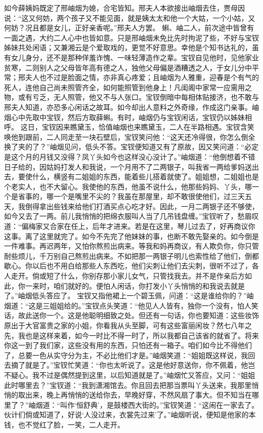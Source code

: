 \documentclass[12pt,oneside]{book}
\begin{document}
如今薛姨妈既定了邢岫烟为媳，合宅皆知。邢夫人本欲接出岫烟去住，贾母因说：“这又何妨，两个孩子又不能见面，就是姨太太和他一个大姑，一个小姑，又何妨？况且都是女儿，正好亲香呢。”邢夫人方罢。
蝌、岫二人，前次途中皆曾有一面之遇，大约二人心中也皆如意。只是邢岫烟未免比先时拘泥了些，不好与宝钗姊妹共处闲语；又兼湘云是个爱取戏的，更觉不好意思。幸他是个知书达礼的，虽有女儿身分，还不是那种佯羞诈愧、一味轻薄造作之辈。宝钗自见他时，见他家业贫寒，二则别人之父母皆年高有德之人，独他父母偏是酒糟透之人，于女儿分中平常；邢夫人也不过是脸面之情，亦非真心疼爱；且岫烟为人雅重，迎春是个有气的死人，连他自己尚未照管齐全，如何能照管到他身上！凡闺阁中家常一应需用之物，或有亏乏，无人照管，他又不与人张口。宝钗倒暗中每相体贴接济，也不敢与邢夫人知道，亦恐多心闲话之故耳。如今却出人意料之外奇缘，作成这门亲事。岫烟心中先取中宝钗，然后方取薛蝌。有时，岫烟仍与宝钗闲话，宝钗仍以姊妹相呼。
这日，宝钗因来瞧黛玉，恰值岫烟也来瞧黛玉，二人在半路相遇。宝钗含笑唤他到跟前，二人同走至一块石壁后，宝钗笑问他：“这天还冷得很，你怎么倒全换了夹的了？”岫烟见问，低头不答。宝钗便知道又有了原故，因又笑问道：“必定是这个月的月钱又没得？凤丫头如今也这样没心没计了。”岫烟道：“他倒想着不错日子给的，因姑妈打发人和我说，一个月用不了二两银子，叫我省一两给爹妈送出去，要使什么，横竖有二姐姐的东西，能着些儿搭着就使了。姐姐想，二姐姐也是个老实人，也不大留心。我使他的东西，他虽不说什么，他那些妈妈、丫头，哪一个是省事的，哪一个是嘴里不尖的？我虽在那屋里，却不敢很使他们，过三天五天，我倒得拿出些钱来给他们打酒买点心吃才好。因此，一月二两银子还不够使，如今又去了一两。前儿我悄悄的把绵衣服叫人当了几吊钱盘缠。”宝钗听了，愁眉叹道：“偏梅家又合家在任上，后年才进来。若是在这里，琴儿过去了，好再商议你这事。离了这里就完了。如今不先完了他妹妹的事，也断不敢先娶亲的。如今倒是一件难事。再迟两年，又怕你熬煎出病来。等我和妈再商议，有人欺负你，你只管耐些烦儿，千万别自己熬煎出病来。不如把那一两银子明儿也索性给了他们，倒都歇心。你以后也不用白给那些人东西吃，他们尖刺让他们去尖刺，很听不过了，各人走开。倘或短了什么，你别存那小家儿女气，只管找我去。并不是作亲后方如此，你一来时，咱们就好的。便怕人闲话，你打发小丫头悄悄的和我说去就是了。”岫烟低头答应了。
宝钗又指他裙上一个碧玉佩，问道：“这是谁给你的？”岫烟道：“这是三姐姐给的。”宝钗点头笑道：“他见人人皆有，独你一个没有，怕人笑话，故此送你一个。这是他聪明细致之处。但还有一句话，你也要知道：这些妆饰原出于大官富贵之家的小姐，你看我从头至脚，可有这些富丽闲妆？然七八年之先，我也是这样来着，如今一时比不得一时了，所以我都自己该省的就省了。将来你这一到了我们家，这些没有用的东西，只怕还有一箱子。咱们如今比不得他们了，总要一色从实守分为主，不必比他们才是。”岫烟笑道：“姐姐既这样说，我回去摘了就是了。”宝钗忙笑道：“你也太听说了。这是他好意送你，你不佩着，他岂不疑心。我不过是偶然提到这里，以后知道就是了。”岫烟忙又答应，又问：“姐姐此时哪里去？”宝钗道：“我到潇湘馆去。你且回去把那当票叫丫头送来，我那里悄悄的取出来，晚上再悄悄的送给你去，早晚好穿，不然风扇了事大。但不知当在哪里了？”岫烟道：“叫作‘恒舒典’，是鼓楼西大街的。”宝钗笑道：“这闹在一家去了。伙计们倘或知道了，好说‘人没过来，衣裳先过来’了。”岫烟听说，便知是他家的本钱，也不觉红了脸，一笑，二人走开。
\end{document}
